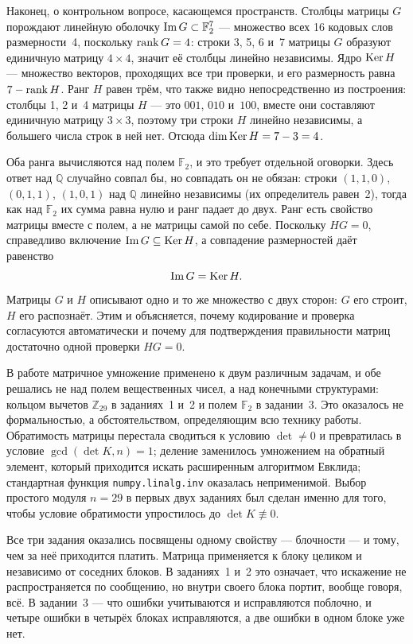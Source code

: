 \documentclass[a4paper,14pt]{extarticle}
\begin{document}
Наконец, о контрольном вопросе, касающемся пространств. Столбцы матрицы $G$ порождают
линейную оболочку $\operatorname{Im} G \subset \mathbb{F}_2^7$ --- множество всех 16 кодовых слов
размерности~4, поскольку $\operatorname{rank} G = 4$: строки 3, 5, 6 и~7 матрицы $G$ образуют
единичную матрицу $4\times4$, значит её столбцы линейно независимы. Ядро $\operatorname{Ker} H$ ---
множество векторов, проходящих все три проверки, и его размерность равна
$7 - \operatorname{rank} H$. Ранг $H$ равен трём, что также видно непосредственно из построения:
столбцы 1, 2 и~4 матрицы $H$ --- это $001$, $010$ и~$100$, вместе они составляют
единичную матрицу $3\times3$, поэтому три строки $H$ линейно независимы, а большего
числа строк в ней нет. Отсюда $\dim \operatorname{Ker} H = 7 - 3 = 4$.

Оба ранга вычисляются над полем $\mathbb{F}_2$, и это требует отдельной оговорки.
Здесь ответ над $\mathbb{Q}$ случайно совпал бы, но совпадать он не обязан: строки
$(1,1,0)$, $(0,1,1)$, $(1,0,1)$ над $\mathbb{Q}$ линейно независимы (их определитель
равен~2), тогда как над $\mathbb{F}_2$ их сумма равна нулю и ранг падает до двух. Ранг
есть свойство матрицы вместе с полем, а не матрицы самой по себе. Поскольку $HG = 0$,
справедливо включение $\operatorname{Im} G \subseteq \operatorname{Ker} H$, а совпадение размерностей даёт
равенство
\begin{equation}
  \operatorname{Im} G = \operatorname{Ker} H .
  \label{eq:imker}
\end{equation}
Матрицы $G$ и $H$ описывают одно и то же множество с двух сторон: $G$ его строит,
$H$ его распознаёт. Этим и объясняется, почему кодирование и проверка согласуются
автоматически и почему для подтверждения правильности матриц достаточно одной проверки
$HG = 0$.


В работе матричное умножение применено к двум различным задачам, и обе решались не над
полем вещественных чисел, а над конечными структурами: кольцом вычетов
$\mathbb{Z}_{29}$ в заданиях~1 и~2 и полем $\mathbb{F}_2$ в задании~3. Это оказалось
не формальностью, а обстоятельством, определяющим всю технику работы. Обратимость
матрицы перестала сводиться к условию $\det \ne 0$ и превратилась в условие
$\gcd(\det K, n) = 1$; деление заменилось умножением на обратный элемент, который
приходится искать расширенным алгоритмом Евклида; стандартная функция
\texttt{numpy.linalg.inv} оказалась неприменимой. Выбор простого модуля $n = 29$ в
первых двух заданиях был сделан именно для того, чтобы условие обратимости упростилось
до $\det K \not\equiv 0$.

Все три задания оказались посвящены одному свойству --- блочности --- и тому, чем за
неё приходится платить. Матрица применяется к блоку целиком и независимо от соседних
блоков. В заданиях~1 и~2 это означает, что искажение не распространяется по сообщению,
но внутри своего блока портит, вообще говоря, всё. В задании~3 --- что ошибки
учитываются и исправляются поблочно, и четыре ошибки в четырёх блоках исправляются, а
две ошибки в одном блоке уже нет.
\end{document}
